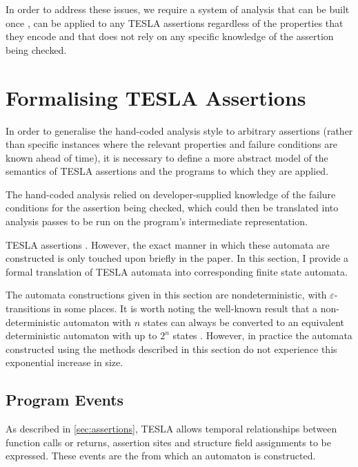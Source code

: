 In order to address these issues, we require a system of analysis that can be
built once , can be applied to any TESLA assertions
regardless of the properties that they encode and that does not rely on any
specific knowledge of the assertion being checked.

\section{Formalising TESLA Assertions} \label{sec:formal}

In order to generalise the hand-coded analysis style to arbitrary assertions
(rather than specific instances where the relevant properties and failure
conditions are known ahead of time), it is necessary to define a more abstract
model of the semantics of TESLA assertions and the programs to which they are
applied.

The hand-coded analysis relied on developer-supplied knowledge of the failure
conditions for the assertion being checked, which could then be translated into
analysis passes to be run on the program's intermediate representation.

TESLA assertions . However, the exact manner in which these automata are constructed is
only touched upon briefly in the paper. In this section, I provide a formal
translation of TESLA automata into corresponding finite state automata.

The automata constructions given in this section are nondeterministic, with
$\varepsilon$-transitions in some places. It is worth noting the well-known
result that a non-deterministic automaton with $n$ states can always be
converted to an equivalent deterministic automaton with up to $2^n$ states
\cite{rabin_finite_1959}. However, in practice the automata constructed using
the methods described in this section do not experience this exponential
increase in size.

\subsection{Program Events}

As described in \autoref{sec:assertions}, TESLA allows temporal relationships
between function calls or returns, assertion sites and structure field
assignments to be expressed. These events are the 
from which an automaton is constructed.

